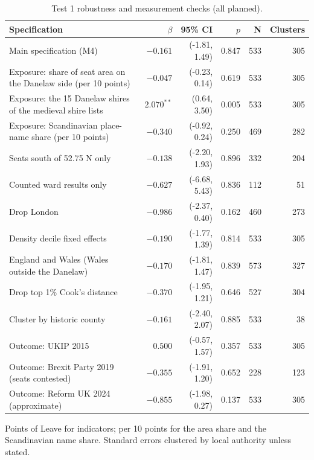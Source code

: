 \documentclass[11pt,a4paper]{article}
\begin{document}
\begin{table}[tbp]\centering\scriptsize\caption{Test 1 robustness and measurement checks (all planned).}\label{tab:rob1}\begin{tabular}{p{7.4cm}rrrrr}\toprule Specification & $\beta$ & 95\% CI & $p$ & N & Clusters\\\midrule
Main specification (M4) & $-0.161$ & (-1.81, 1.49) & 0.847 & 533 & 305\\
Exposure: share of seat area on the Danelaw side (per 10 points) & $-0.047$ & (-0.23, 0.14) & 0.619 & 533 & 305\\
Exposure: the 15 Danelaw shires of the medieval shire lists & $2.070^{**}$ & (0.64, 3.50) & 0.005 & 533 & 305\\
Exposure: Scandinavian place-name share (per 10 points) & $-0.340$ & (-0.92, 0.24) & 0.250 & 469 & 282\\
Seats south of 52.75 N only & $-0.138$ & (-2.20, 1.93) & 0.896 & 332 & 204\\
Counted ward results only & $-0.627$ & (-6.68, 5.43) & 0.836 & 112 & 51\\
Drop London & $-0.986$ & (-2.37, 0.40) & 0.162 & 460 & 273\\
Density decile fixed effects & $-0.190$ & (-1.77, 1.39) & 0.814 & 533 & 305\\
England and Wales (Wales outside the Danelaw) & $-0.170$ & (-1.81, 1.47) & 0.839 & 573 & 327\\
Drop top 1\% Cook's distance & $-0.370$ & (-1.95, 1.21) & 0.646 & 527 & 304\\
Cluster by historic county & $-0.161$ & (-2.40, 2.07) & 0.885 & 533 & 38\\
Outcome: UKIP 2015 & $0.500$ & (-0.57, 1.57) & 0.357 & 533 & 305\\
Outcome: Brexit Party 2019 (seats contested) & $-0.355$ & (-1.91, 1.20) & 0.652 & 228 & 123\\
Outcome: Reform UK 2024 (approximate) & $-0.855$ & (-1.98, 0.27) & 0.137 & 533 & 305\\
\bottomrule\end{tabular}\par\vspace{0.3em}\parbox{0.92\textwidth}{\scriptsize Points of Leave for indicators; per 10 points for the area share and the Scandinavian name share. Standard errors clustered by local authority unless stated.}\end{table}
\end{document}
